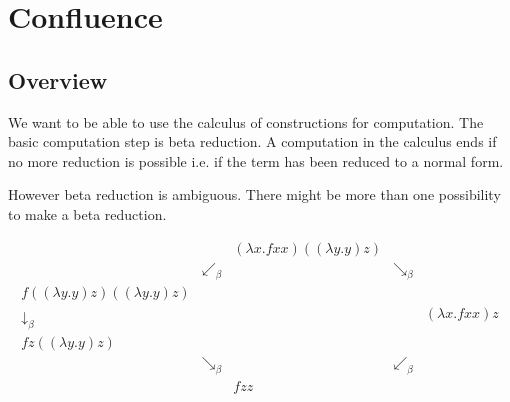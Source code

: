 \section{Confluence}
\label{sec:Confluence}

\begin{comment}

    Why: Make lambda calculus really a model of computation. Result (i.e. a
    term in normal form) is independent of the reduction sequence.

    Goal: Uniqueness of normal forms and beta equivalent terms have a common
    reduct. Corollaries: Equivalent binders have equivalent subterms and binders
    cannot reduce to be beta equivalent with sorts or variables.

    Basic Property: Beta reduction is confluent.


    Prove of confluence:

    - Definition via diamonds

    - Diamond between a relation and its reflexive transitive closure proves the
    confluence of the relation.

    - Parallel beta reduction is a diamond between beta reduction and its
    reflexive transitive closure.


\end{comment}




\subsection{Overview}

We want to be able to use the calculus of constructions for computation.
The basic computation step is beta reduction. A computation in the calculus ends
if no more reduction is possible i.e. if the term has been reduced to a normal
form.

However beta reduction is ambiguous. There might be more than one possibility to
make a beta reduction.

\begin{example}
    \label{ex:Confluence}
    $$
    \begin{array}{cccccc}
        & & (\lambda x. f x x) ((\lambda y.y) z)
        \\
        & \swarrow_{\beta}
        & & \searrow_\beta
        \\
        f ((\lambda y.y) z) ((\lambda y.y) z)
        \\
        \downarrow_\beta
        & & & & (\lambda x . f x x) z
        \\
        f z ((\lambda y.y) z)
        \\
        & \searrow_\beta
        & &  \swarrow_\beta
        \\
        & & f z z
    \end{array}
    $$
\end{example}

